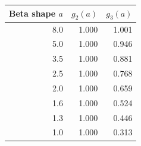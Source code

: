 \begin{tabular}{rrr}
\toprule
Beta shape $a$ & $g_2(a)$ & $g_3(a)$ \\
\midrule
8.0 & 1.000 & 1.001 \\
5.0 & 1.000 & 0.946 \\
3.5 & 1.000 & 0.881 \\
2.5 & 1.000 & 0.768 \\
2.0 & 1.000 & 0.659 \\
1.6 & 1.000 & 0.524 \\
1.3 & 1.000 & 0.446 \\
1.0 & 1.000 & 0.313 \\
\bottomrule
\end{tabular}
